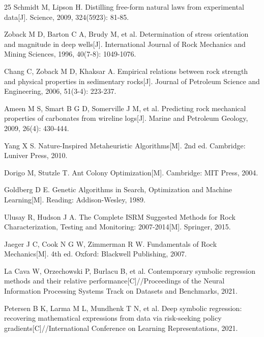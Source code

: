 \documentclass[a4paper,12pt]{ctexart}
\begin{document}
\begin{thebibliography}{25}
Schmidt M, Lipson H. Distilling free-form natural laws from experimental data[J]. Science, 2009, 324(5923): 81-85.

 Zoback M D, Barton C A, Brudy M, et al. Determination of stress orientation and magnitude in deep wells[J]. International Journal of Rock Mechanics and Mining Sciences, 1996, 40(7-8): 1049-1076.

 Chang C, Zoback M D, Khaksar A. Empirical relations between rock strength and physical properties in sedimentary rocks[J]. Journal of Petroleum Science and Engineering, 2006, 51(3-4): 223-237.

 Ameen M S, Smart B G D, Somerville J M, et al. Predicting rock mechanical properties of carbonates from wireline logs[J]. Marine and Petroleum Geology, 2009, 26(4): 430-444.

 Yang X S. Nature-Inspired Metaheuristic Algorithms[M]. 2nd ed. Cambridge: Luniver Press, 2010.

 Dorigo M, Stutzle T. Ant Colony Optimization[M]. Cambridge: MIT Press, 2004.

 Goldberg D E. Genetic Algorithms in Search, Optimization and Machine Learning[M]. Reading: Addison-Wesley, 1989.

 Ulusay R, Hudson J A. The Complete ISRM Suggested Methods for Rock Characterization, Testing and Monitoring: 2007-2014[M]. Springer, 2015.

 Jaeger J C, Cook N G W, Zimmerman R W. Fundamentals of Rock Mechanics[M]. 4th ed. Oxford: Blackwell Publishing, 2007.

 La Cava W, Orzechowski P, Burlacu B, et al. Contemporary symbolic regression methods and their relative performance[C]//Proceedings of the Neural Information Processing Systems Track on Datasets and Benchmarks, 2021.

 Petersen B K, Larma M L, Mundhenk T N, et al. Deep symbolic regression: recovering mathematical expressions from data via risk-seeking policy gradients[C]//International Conference on Learning Representations, 2021.

\end{thebibliography}
\end{document}
